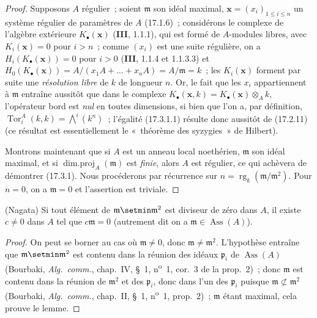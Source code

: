 \begin{proof}
Supposons $A$ régulier~; soient $\mathfrak{m}$ son idéal maximal,
$\mathbf{x}=(x_i)_{1\leq i\leq n}$ un système régulier de paramètres de $A$
(17.1.6)~; considérons le complexe de l'algèbre extérieure
$K_\bullet(\mathbf{x})$ (\textbf{III}, 1.1.1), qui est formé de $A$-modules
libres, avec $K_i(\mathbf{x})=0$ pour $i>n$~; comme $(x_i)$ est une suite
régulière, on a $H_i(K_\bullet(\mathbf{x}))=0$ pour $i>0$ (\textbf{III},
1.1.4 et 1.1.3.3) et
$H_0(K_\bullet(\mathbf{x}))=A/(x_1A+\ldots+x_nA)=A/\mathfrak{m}=k$~; les
$K_i(\mathbf{x})$ forment par suite une \emph{résolution libre} de $k$ de
longueur $n$. Or, le fait que les $x_i$ appartiennent à $\mathfrak{m}$
entraîne aussitôt que dans le complexe
$K_\bullet(\mathbf{x},k)=K_\bullet(\mathbf{x})\otimes_A k$, l'opérateur bord
est \emph{nul} en toutes dimensions, si bien que l'on a, par définition,
$\operatorname{Tor}^A_i(k,k)=\bigwedge^i(k^n)$~; l'égalité (17.3.1.1) résulte
donc aussitôt de (17.2.11) (ce résultat est essentiellement le «~théorème des
syzygies~» de Hilbert).

Montrons maintenant que si $A$ est un anneau local noethérien,
$\mathfrak{m}$ son idéal maximal, et si
$\operatorname{dim.proj}_A(\mathfrak{m})$ est \emph{finie}, alors $A$ est
régulier, ce qui achèvera de démontrer (17.3.1). Nous procéderons par
récurrence sur $n=\operatorname{rg}_k(\mathfrak{m}/\mathfrak{m}^2)$. Pour
$n=0$, on a $\mathfrak{m}=0$ et l'assertion est triviale.
\end{proof}

\begin{lemma}[17.3.1.2]
\label{0.17.3.1.2-fr}
\textnormal{(Nagata)} Si tout élément de
$\mathfrak{m}\setmin\mathfrak{m}^2$ est diviseur de zéro dans $A$, il existe
$c\neq0$ dans $A$ tel que $c\mathfrak{m}=0$ (autrement dit on a
$\mathfrak{m}\in\operatorname{Ass}(A)$).
\end{lemma}

\begin{proof}
On peut se borner au cas où $\mathfrak{m}\neq0$, donc
$\mathfrak{m}\neq\mathfrak{m}^2$. L'hypothèse entraîne que
$\mathfrak{m}\setmin\mathfrak{m}^2$ est contenu dans la réunion des idéaux
$\mathfrak{p}_i$ de $\operatorname{Ass}(A)$ (Bourbaki,
\emph{Alg.~comm.}, chap.~IV, \S~1, n\textsuperscript{o}~1, cor.~3 de la prop.~2)~; donc
$\mathfrak{m}$ est contenu dans la réunion de $\mathfrak{m}^2$
et des $\mathfrak{p}_i$, donc dans l'un des $\mathfrak{p}_i$ puisque
$\mathfrak{m}\not\subset\mathfrak{m}^2$ (Bourbaki, \emph{Alg.~comm.},
chap.~II, \S~1, n\textsuperscript{o}~1, prop.~2)~; $\mathfrak{m}$ étant maximal, cela prouve le
lemme.
\end{proof}

